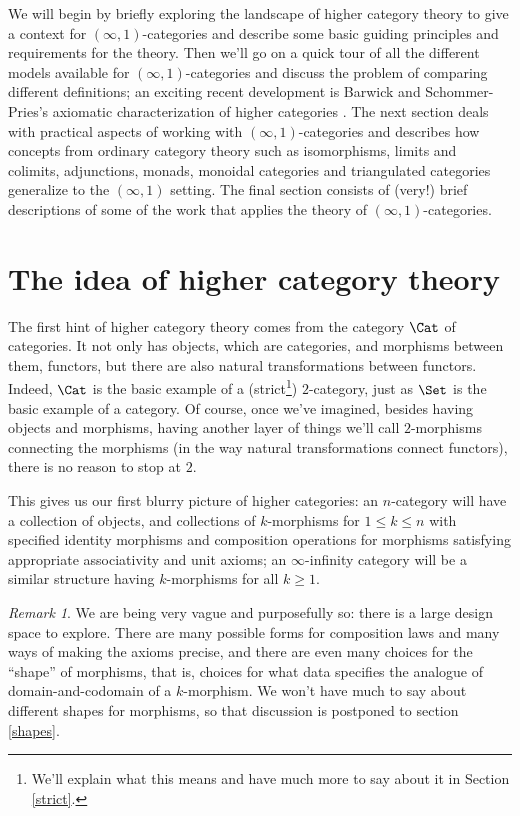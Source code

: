 \documentclass[12pt]{amsart}
\theoremstyle{definition} \newtheorem{definition}[theorem]{Definition}
\theoremstyle{remark} \newtheorem{remark}[theorem]{Remark}
\numberwithin{equation}{section}
\newcommand{\oo}{\infty}
\newcommand{\io}{$(\oo,1)$}
\begin{document}
We will begin by briefly exploring the landscape of higher category
theory to give a context for \io-categories and describe some basic
guiding principles and requirements for the theory. Then we'll go on a
quick tour of all the different models available for \io-categories
and discuss the problem of comparing different definitions; an
exciting recent development is Barwick and Schommer-Pries's axiomatic
characterization of higher categories \cite{ClarkChris}. The next
section deals with practical aspects of working with \io-categories
and describes how concepts from ordinary category theory such as
isomorphisms, limits and colimits, adjunctions, monads, monoidal
categories and triangulated categories generalize to the \io{}
setting. The final section consists of (very!) brief descriptions
of some of the work that applies the theory of \io-categories.

\section{The idea of higher category theory}

The first hint of higher category theory comes from the category
$\Cat$ of categories. It not only has objects, which are categories,
and morphisms between them, functors, but there are also natural
transformations between functors. Indeed, $\Cat$ is the basic example
of a (strict\footnote{We'll explain what this means and have much more
to say about it in Section \ref{strict}.}) $2$-category, just as
$\Set$ is the basic example of a category. Of course, once we've
imagined, besides having objects and morphisms, having another layer
of things we'll call $2$-morphisms connecting the morphisms (in the
way natural transformations connect functors), there is no reason to
stop at $2$.

This gives us our first blurry picture of higher categories: an
$n$-category will have a collection of objects, and collections of
$k$-morphisms for $1 \le k \le n$ with specified identity morphisms
and composition operations for morphisms satisfying appropriate
associativity and unit axioms; an $\oo$-infinity category will be a
similar structure having $k$-morphisms for all $k \ge 1$.

\begin{remark} We are being very vague and purposefully so: there is a
large design space to explore. There are many possible forms for
composition laws and many ways of making the axioms precise, and there
are even many choices for the ``shape'' of morphisms, that is, choices
for what data specifies the analogue of domain-and-codomain of a
$k$-morphism. We won't have much to say about different shapes for
morphisms, so that discussion is postponed to section \ref{shapes}.
\end{remark}
\end{document}
